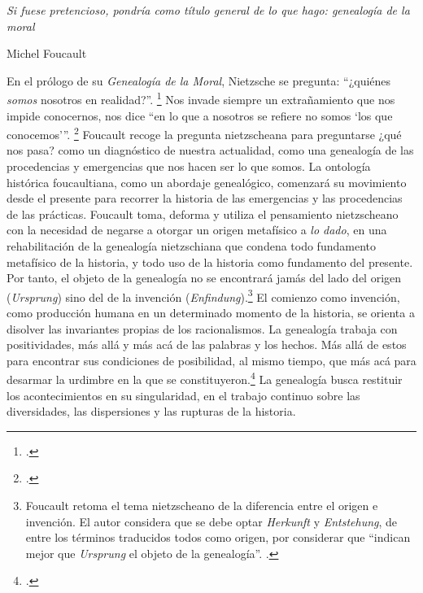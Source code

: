 \epigraph{\emph{Si fuese pretencioso, pondría como título general de lo que hago: genealogía de la moral}}{Michel Foucault}


En el prólogo de su \emph{Genealogía de la Moral}, Nietzsche se pregunta: \enquote{¿quiénes \emph{somos} nosotros en realidad?}. \footcite[][22]{@7044-NIETZSCHE2009} Nos invade siempre un extrañamiento que nos impide conocernos, nos dice \enquote{en lo que a nosotros se refiere no somos \enquote{los que conocemos}}. \footcite[][22]{@7044-NIETZSCHE2009} Foucault recoge la pregunta nietzscheana para preguntarse ¿qué nos pasa? como un diagnóstico de nuestra actualidad, como una genealogía de las procedencias y emergencias que nos hacen ser lo que somos. La ontología histórica foucaultiana, como un abordaje genealógico, comenzará su movimiento desde el presente para recorrer la historia de las emergencias y las procedencias de las prácticas. Foucault toma, deforma y utiliza el pensamiento nietzscheano con la necesidad de negarse a otorgar un origen metafísico a \emph{lo dado}, en una rehabilitación de la genealogía nietzschiana que condena todo fundamento metafísico de la historia, y todo uso de la historia como fundamento del presente. Por tanto, el objeto de la genealogía no se encontrará jamás del lado del origen (\emph{Ursprung}) sino del de la invención (\emph{Enfindung}).\footnote{Foucault retoma el tema nietzscheano de la diferencia entre el origen e invención. El autor considera que se debe optar \emph{Herkunft} y \emph{Entstehung}, de entre los términos traducidos todos como origen, por considerar que \enquote{indican mejor que \emph{Ursprung} el objeto de la genealogía}. \cite[][24]{@7045-FOUCAULT2008}.} El comienzo como invención, como producción humana en un determinado momento de la historia, se orienta a disolver las invariantes propias de los racionalismos. La genealogía trabaja con positividades, más allá y más acá de las palabras y los hechos. Más allá de estos para encontrar sus condiciones de posibilidad, al mismo tiempo, que más acá para desarmar la urdimbre en la que se constituyeron.\footcite[][87]{@7046-DIAZ2005} La genealogía busca restituir los acontecimientos en su singularidad, en el trabajo continuo sobre las diversidades, las dispersiones y las rupturas de la historia.

